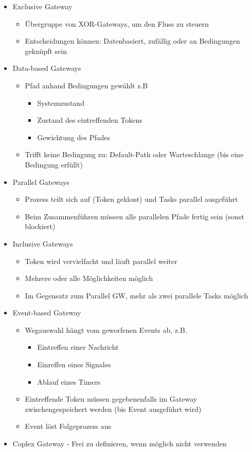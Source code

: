 \begin{itemize}
    \item Exclusive Gateway
    \begin{itemize}
        \item Übergruppe von XOR-Gateways, um den Fluss zu steuern
        \item Entscheidungen können: Datenbasiert, zufällig oder an Bedingungen geknüpft sein
    \end{itemize}
    \item Data-based Gateways
    \begin{itemize}
        \item Pfad anhand Bedingungen gewählt z.B
        \begin{itemize}
            \item Systemzustand
            \item Zustand des eintreffenden Tokens
            \item Gewichtung des Pfades
        \end{itemize}
        \item Trifft keine Bedingung zu: Default-Path oder Warteschlange (bis eine Bedingung erfüllt)
    \end{itemize}
    \item Parallel Gateways
    \begin{itemize}
        \item Prozess teilt sich auf (Token geklont) und Tasks parallel ausgeführt
        \item Beim Zusammenführen müssen alle parallelen Pfade fertig sein (sonst blockiert)
    \end{itemize}
    \item Inclusive Gateways
    \begin{itemize}
        \item Token wird vervielfacht und läuft parallel weiter
        \item Mehrere oder alle Möglichkeiten möglich
        \item Im Gegensatz zum Parallel GW, mehr als zwei parallele Tasks möglich
    \end{itemize}
    \item Event-based Gateway
    \begin{itemize}
        \item Wegauswahl hängt vom geworfenen Events ab, z.B.
        \begin{itemize}
            \item Eintreffen einer Nachricht
            \item Einreffen eines Signales
            \item Ablauf eines Timers
        \end{itemize}
        \item Eintreffende Token müssen gegebenenfalls im Gateway zwischengespeichert werden (bis Event ausgeführt wird)
        \item Event löst Folgeprozess aus
    \end{itemize}
    \item Coplex Gateway - Frei zu definieren, wenn möglich nicht verwenden
\end{itemize}

